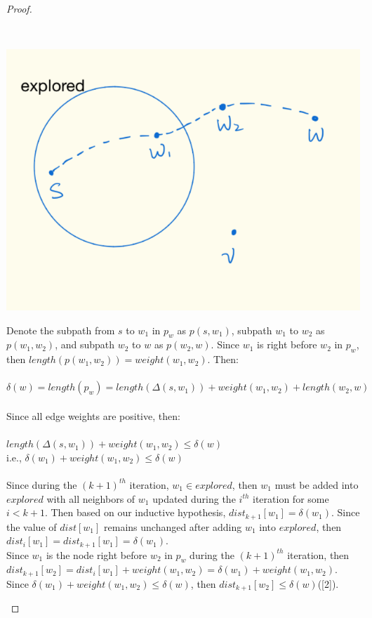 \documentclass[11pt, oneside]{article}   	%
\newcommand\tab[1][1cm]{\hspace*{#1}}
\theoremstyle{definition}
\begin{document}
\begin{proof}
\begin{enumerate}
\\
\begin{center}
\includegraphics[scale = 0.35]{p1.png}
\end{center}
\newpage 
Denote the subpath from $s$ to $w_1$ in $p_w$ as $p(s, w_1)$, subpath $w_1$ to $w_2$ as $p(w_1, w_2)$, and subpath $w_2$ to $w$ as $p(w_2, w)$. Since $w_1$ is right before $w_2$ in $p_w$, then $length(p(w_1, w_2)) = weight(w_1, w_2)$. Then: 
\\\\
  \tab $\delta(w) = length(p_w) = length(\Delta(s, w_1)) + weight(w_1, w_2) + length(w_2, w)$
\\\\
Since all edge weights are positive, then: 
\\\\
  \tab $length(\Delta(s, w_1)) + weight(w_1, w_2) \leq \delta(w)$\\
  \tab i.e., $\delta(w_1) + weight(w_1, w_2) \leq \delta(w)$
\\\\
Since during the $(k+1)^{th}$ iteration, $w_1 \in explored$, then $w_1$ must be added into $explored$ with all neighbors of $w_1$ updated during the $i^{th}$ iteration for some $i < k+1$. Then based on our inductive hypothesis, $dist_{k+1}[w_1] = \delta(w_1)$. Since the value of $dist[w_1]$ remains unchanged after adding $w_1$ into $explored$, then $dist_i[w_1] = dist_{k+1}[w_1] = \delta(w_1)$. 
\\
Since $w_1$ is the node right before $w_2$ in $p_w$ during the $(k+1)^{th}$ iteration, then $dist_{k+1}[w_2] = dist_{i}[w_1] + weight(w_1, w_2) = \delta(w_1) + weight(w_1, w_2)$. Since $\delta(w_1) + weight(w_1, w_2) \leq \delta(w)$, then $dist_{k+1}[w_2] \leq \delta(w)$([2]).

\end{enumerate}
\end{proof}
\end{document}
